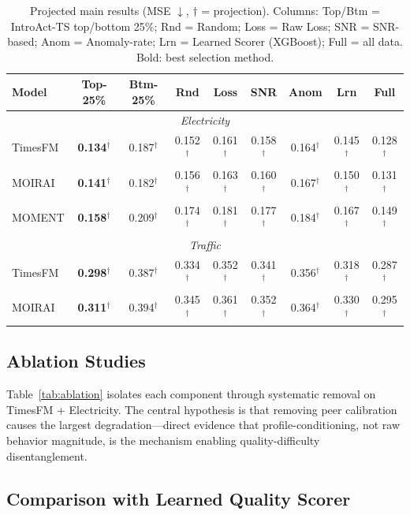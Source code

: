 \documentclass{article}
\begin{document}
\begin{table}[t]
\centering
\caption{Projected main results (MSE $\downarrow$, $\dagger$ = projection). Columns: Top/Btm = IntroAct-TS top/bottom 25\%; Rnd = Random; Loss = Raw Loss; SNR = SNR-based; Anom = Anomaly-rate; Lrn = Learned Scorer (XGBoost); Full = all data. Bold: best selection method.}
\label{tab:main_results}
\begin{tabular}{lcccccccc}
\toprule
\textbf{Model} & \textbf{Top-25\%} & \textbf{Btm-25\%} & \textbf{Rnd} & \textbf{Loss} & \textbf{SNR} & \textbf{Anom} & \textbf{Lrn} & \textbf{Full} \\
\midrule
\multicolumn{9}{c}{\textit{Electricity}} \\
TimesFM & \textbf{0.134}$^\dagger$ & 0.187$^\dagger$ & 0.152$^\dagger$ & 0.161$^\dagger$ & 0.158$^\dagger$ & 0.164$^\dagger$ & 0.145$^\dagger$ & 0.128$^\dagger$ \\
MOIRAI & \textbf{0.141}$^\dagger$ & 0.182$^\dagger$ & 0.156$^\dagger$ & 0.163$^\dagger$ & 0.160$^\dagger$ & 0.167$^\dagger$ & 0.150$^\dagger$ & 0.131$^\dagger$ \\
MOMENT & \textbf{0.158}$^\dagger$ & 0.209$^\dagger$ & 0.174$^\dagger$ & 0.181$^\dagger$ & 0.177$^\dagger$ & 0.184$^\dagger$ & 0.167$^\dagger$ & 0.149$^\dagger$ \\
\midrule
\multicolumn{9}{c}{\textit{Traffic}} \\
TimesFM & \textbf{0.298}$^\dagger$ & 0.387$^\dagger$ & 0.334$^\dagger$ & 0.352$^\dagger$ & 0.341$^\dagger$ & 0.356$^\dagger$ & 0.318$^\dagger$ & 0.287$^\dagger$ \\
MOIRAI & \textbf{0.311}$^\dagger$ & 0.394$^\dagger$ & 0.345$^\dagger$ & 0.361$^\dagger$ & 0.352$^\dagger$ & 0.364$^\dagger$ & 0.330$^\dagger$ & 0.295$^\dagger$ \\
\bottomrule
\end{tabular}
\end{table}

\subsection{Ablation Studies}

Table~\ref{tab:ablation} isolates each component through systematic removal on TimesFM + Electricity. The central hypothesis is that removing peer calibration causes the largest degradation---direct evidence that profile-conditioning, not raw behavior magnitude, is the mechanism enabling quality-difficulty disentanglement.

\subsection{Comparison with Learned Quality Scorer}
\label{sec:learned_baseline}
\end{document}
